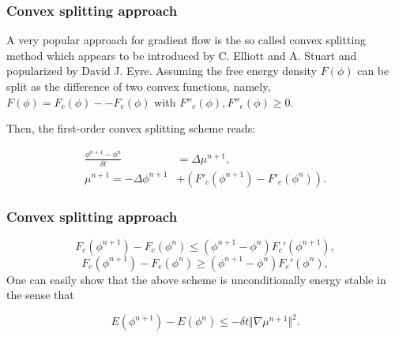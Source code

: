 \documentclass{beamer}
\begin{document}
    \begin{frame}
    \frametitle{Convex splitting approach}

A very popular approach for gradient flow is the so called convex splitting method which appears to be introduced by C. Elliott and A. Stuart and popularized by David J. Eyre. Assuming the free energy density $F(\phi)$ can be split as the difference of two convex functions, namely, $F(\phi)=F_c(\phi)-−F_e(\phi)$ with $F''_c(\phi), F''_e(\phi)\geq 0.$

 Then, the first-order convex splitting scheme reads:

\begin{equation}\label{Convex}
  \begin{split}
     \frac{\phi^{n+1}-\phi^n}{\delta t}&=\Delta \mu^{n+1},\\
     \mu^{n+1} = -\Delta\phi^{n+1}&+(F'_c(\phi^{n+1})-F'_e(\phi^n)).
  \end{split}
\end{equation}

    \end{frame}
    \begin{frame}
    \frametitle{Convex splitting approach}
    $$
    F_c(\phi^{n+1})-F_c(\phi^n)\leq(\phi^{n+1}-\phi^n)F_c'(\phi^{n+1}),
    $$
    $$
    F_e(\phi^{n+1})-F_e(\phi^n)\geq(\phi^{n+1}-\phi^n)F_e'(\phi^{n}),
    $$
One can easily show that the above scheme is unconditionally energy stable in the sense that

$$
E(\phi^{n+1})-E(\phi^n)\leq -\delta t \Vert\nabla\mu^{n+1}\Vert^2.
$$



    \end{frame}
\end{document}
